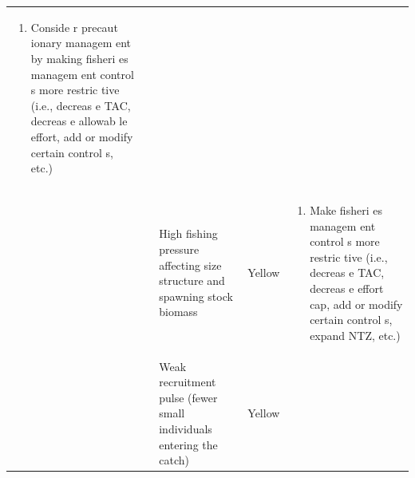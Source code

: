 \documentclass[]{book}
\providecommand{\tightlist}{%
  \setlength{\itemsep}{0pt}\setlength{\parskip}{0pt}}
\begin{document}
\begin{longtable}[]{@{}lllll@{}}
\begin{minipage}[t]{0.19\columnwidth}
\begin{enumerate}
\def\labelenumi{\arabic{enumi}.}
\setcounter{enumi}{1}
\tightlist
\item
  Conside r precaut ionary managem ent by making fisheri es managem ent
  control s more restric tive (i.e., decreas e TAC, decreas e allowab le
  effort, add or modify certain control s, etc.)
\end{enumerate}\strut
\end{minipage}\tabularnewline
\begin{minipage}[t]{0.19\columnwidth}\raggedright\strut
\strut
\end{minipage} & \begin{minipage}[t]{0.19\columnwidth}\raggedright\strut
\strut
\end{minipage} & \begin{minipage}[t]{0.19\columnwidth}\raggedright\strut
High fishing pressure affecting size structure and spawning stock
biomass\strut
\end{minipage} & \begin{minipage}[t]{0.19\columnwidth}\raggedright\strut
Yellow\strut
\end{minipage} & \begin{minipage}[t]{0.19\columnwidth}\raggedright\strut
\begin{enumerate}
\def\labelenumi{\arabic{enumi}.}
\tightlist
\item
  Make fisheri es managem ent control s more restric tive (i.e., decreas
  e TAC, decreas e effort cap, add or modify certain control s, expand
  NTZ, etc.)
\end{enumerate}\strut
\end{minipage}\tabularnewline
\begin{minipage}[t]{0.19\columnwidth}\raggedright\strut
\strut
\end{minipage} & \begin{minipage}[t]{0.19\columnwidth}\raggedright\strut
\strut
\end{minipage} & \begin{minipage}[t]{0.19\columnwidth}\raggedright\strut
Weak recruitment pulse (fewer small individuals entering the
catch)\strut
\end{minipage} & \begin{minipage}[t]{0.19\columnwidth}\raggedright\strut
Yellow\strut
\end{minipage} & \begin{minipage}[t]{0.19\columnwidth}\raggedright\strut
\begin{enumerate}

\end{enumerate}
\end{minipage}
\end{longtable}
\end{document}
